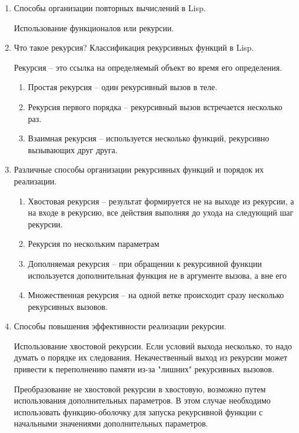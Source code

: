\documentclass[a4paper,14pt]{extreport} %
\begin{document}
\begin{enumerate}
\item Способы организации повторных вычислений в Lisp. 

Использование функционалов или рекурсии. 

\item Что такое рекурсия? Классификация рекурсивных функций в Lisp. 

Рекурсия -- это ссылка на определяемый объект во время его определения. 

\begin{enumerate}
\item Простая рекурсия -- один рекурсивный вызов в теле. 
\item Рекурсия первого порядка -- рекурсивный вызов встречается несколько раз. 
\item Взаимная рекурсия -- используется несколько функций, рекурсивно вызывающих друг друга.
\end{enumerate}

\item Различные способы организации рекурсивных функций и порядок их реализации. 

\begin{enumerate}
\item Хвостовая рекурсия -- результат формируется не на выходе из рекурсии, а на входе в рекурсию, все действия выполняя до ухода на следующий шаг рекурсии. 
\item Рекурсия по нескольким параметрам
\item Дополняемая рекурсия -- при обращении к рекурсивной функции используется дополнительная функция не в аргументе вызова, а вне его
\item Множественная рекурсия -- на одной ветке происходит сразу несколько рекурсивных вызовов.
\end{enumerate}

\item Способы повышения эффективности реализации рекурсии. 

Использование хвостовой рекурсии. Если условий выхода несколько, то надо думать о порядке их следования. Некачественный выход из рекурсии может привести к переполнению памяти из-за "лишних" рекурсивных вызовов. 

Преобразование не хвостовой рекурсии в хвостовую, возможно путем использования дополнительных параметров. В этом случае необходимо использовать функцию-оболочку для запуска рекурсивной функции с начальными значениями дополнительных параметров. 

\end{enumerate}
\end{document}

